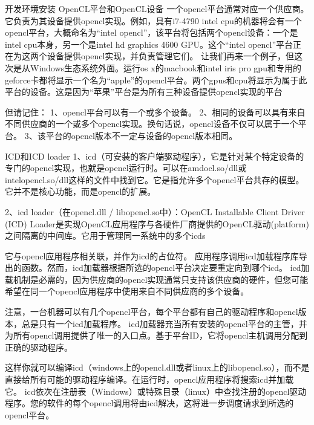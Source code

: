 开发环境安装
OpenCL平台和OpenCL设备
一个opencl平台通常对应一个供应商。它负责为其设备提供opencl实现。例如，具有i7-4790 intel cpu的机器将会有一个opencl平台，大概命名为“intel opencl”，该平台将包括两个opencl设备：一个是intel cpu本身，另一个是intel hd graphics 4600 GPU。这个“intel opencl”平台正在为这两个设备提供opencl实现，并负责管理它们。
让我们再来一个例子，但这次是从Windows生态系统外面。运行os x的macbook和intel iris pro gpu和专用的geforce卡都将显示一个名为“apple”的opencl平台。两个gpus和cpu将显示为属于此平台的设备。这是因为“苹果”平台是为所有三种设备提供opencl实现的平台

但请记住：
1、opencl平台可以有一个或多个设备。
2、相同的设备可以具有来自不同供应商的一个或多个opencl实现。换句话说，opencl设备不仅可以属于一个平台。
3、该平台的opencl版本不一定与设备的opencl版本相同。

ICD和ICD loader
1、icd（可安装的客户端驱动程序），它是针对某个特定设备的专门的opencl实现，也就是opencl运行时。可以在amdocl.so/dll或intelopencl.so/dll这样的文件中找到它。它是指允许多个opencl平台共存的模型。它并不是核心功能，而是opencl的扩展。

2、icd loader（在opencl.dll / libopencl.so中）：OpenCL Installable Client Driver (ICD) Loader是实现OpenCL应用程序与各硬件厂商提供的OpenCL驱动(platform)之间隔离的中间库。它用于管理同一系统中的多个icds

它与opencl应用程序相关联，并作为icd的占位符。
应用程序调用icd加载程序库导出的函数。然而，icd加载器根据所选的opencl平台决定要重定向到哪个icd。
icd加载机制是必需的，因为供应商的opencl实现通常只支持该供应商的硬件，但您可能希望在同一个opencl应用程序中使用来自不同供应商的多个设备。


注意，一台机器可以有几个opencl平台，每个平台都有自己的驱动程序和opencl版本，总是只有一个icd加载程序。 icd加载器充当所有安装的opencl平台的主管，并为所有opencl调用提供了唯一的入口点。基于平台ID，它将opencl主机调用分配到正确的驱动程序。

这样你就可以编译icd（windows上的opencl.dll或者linux上的libopencl.so），而不是直接给所有可能的驱动程序编译。在运行时，opencl应用程序将搜索icd并加载它。 icd依次在注册表（Windows）或特殊目录（linux）中查找注册的opencl驱动程序。您的软件的每个opencl调用将由icd解决，这将进一步调度请求到所选的opencl平台。

